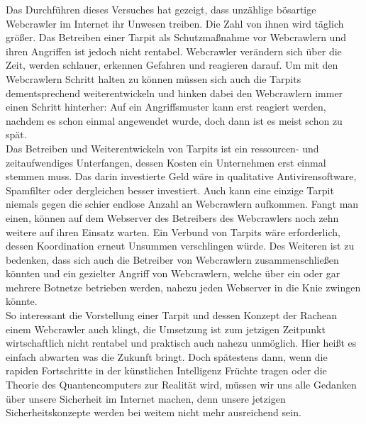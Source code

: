 Das Durchführen dieses Versuches hat gezeigt, dass unzählige bösartige Webcrawler im Internet ihr Unwesen treiben. Die Zahl von ihnen wird täglich größer. Das Betreiben einer Tarpit als Schutzmaßnahme vor Webcrawlern und ihren Angriffen ist jedoch nicht rentabel. Webcrawler verändern sich über die Zeit, werden schlauer, erkennen Gefahren und reagieren darauf. Um mit den Webcrawlern Schritt halten zu können müssen sich auch die Tarpits dementsprechend weiterentwickeln und hinken dabei den Webcrawlern immer einen Schritt hinterher: Auf ein Angriffsmuster kann erst reagiert werden, nachdem es schon einmal angewendet wurde, doch dann ist es meist schon zu spät.\\
Das Betreiben und Weiterentwickeln von Tarpits ist ein ressourcen- und zeitaufwendiges Unterfangen, dessen Kosten ein Unternehmen erst einmal stemmen muss. Das darin investierte Geld wäre in qualitative Antivirensoftware, Spamfilter oder dergleichen besser investiert. Auch kann eine einzige Tarpit niemals gegen die schier endlose Anzahl an Webcrawlern aufkommen. Fangt man einen, können auf dem Webserver des Betreibers des Webcrawlers noch zehn weitere auf ihren Einsatz warten. Ein Verbund von Tarpits wäre erforderlich, dessen Koordination erneut Unsummen verschlingen würde. Des Weiteren ist zu bedenken, dass sich auch die Betreiber von Webcrawlern zusammenschließen könnten und ein gezielter Angriff von Webcrawlern, welche über ein oder gar mehrere Botnetze betrieben werden, nahezu jeden Webserver in die Knie zwingen könnte.\\
So interessant die Vorstellung einer Tarpit und dessen Konzept der \glqq Rache\grqq\space an einem Webcrawler auch klingt, die Umsetzung ist zum jetzigen Zeitpunkt wirtschaftlich nicht rentabel und praktisch auch nahezu unmöglich. Hier heißt es einfach abwarten was die Zukunft bringt. Doch spätestens dann, wenn die rapiden Fortschritte in der künstlichen Intelligenz Früchte tragen oder die Theorie des Quantencomputers zur Realität wird, müssen wir uns alle Gedanken über unsere Sicherheit im Internet machen, denn unsere jetzigen Sicherheitskonzepte werden bei weitem nicht mehr ausreichend sein.